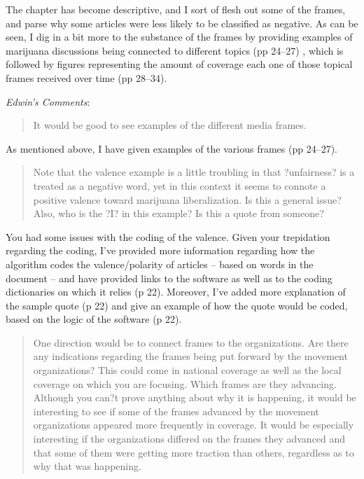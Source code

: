 \documentclass[12pt,stdletter,dateno,sigleft]{newlfm} %
\begin{document}
\begin{newlfm}
The chapter has become descriptive, and I sort of flesh out some of the frames, and parse why some articles were less likely to be classified as negative.  As can be seen, I dig in a bit more to the substance of the frames by providing examples of marijuana discussions being connected to different topics (pp 24--27) , which is followed by figures representing the amount of coverage each one of those topical frames received over time (pp 28--34). \newline

\textit{Edwin's Comments}:


\begin{quotation}{\color{red}\noindent \footnotesize
It would be good to see examples of the different media frames. 
}
\end{quotation}


As mentioned above, I have given examples of the various frames (pp 24--27). 


\begin{quotation}{\color{red}\noindent \footnotesize
Note that the valence example is a little troubling in that ?unfairness? is a treated as a negative word, yet in this context it seems to connote a positive valence toward marijuana liberalization.  Is this a general issue? Also, who is the ?I? in this example? Is this a quote from someone?
}
\end{quotation}



You had some issues with the coding of the valence. Given your trepidation regarding the coding, I've provided more information regarding how the algorithm codes the valence/polarity of articles -- based on words in the document -- and have provided links to the software as well as to the coding dictionaries on which it relies (p 22). Moreover, I've added more explanation of the sample quote (p 22) and give an example of how the quote would be coded, based on the logic of the software (p 22). 


\begin{quotation}{\color{red}\noindent \footnotesize
One direction would be to connect frames to the organizations.  Are there any indications regarding the frames being put forward by the movement organizations?  This could come in national coverage as well as the local coverage on which you are focusing.   Which frames are they advancing.  Although you can?t prove anything about why it is happening, it would be interesting to see if some of the frames advanced by the movement organizations appeared more frequently in coverage.   It would be especially interesting if the organizations differed on the frames they advanced and that some of them were getting more traction than others, regardless as to why that was happening.
}
\end{quotation}


\end{newlfm}
\end{document}
